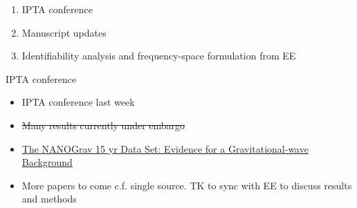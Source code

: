 \documentclass[10pt]{beamer}
\title{}
\subtitle{}
\author{}
\date{EE/GW meeting, June 29, 2023}
\begin{document}
	
	\maketitle
	
	\begin{frame}{}
		
		\begin{enumerate}
			\item IPTA conference
			\item Manuscript updates
			\item Identifiability analysis and frequency-space formulation from EE
		\end{enumerate}
	
\end{frame}



	\begin{frame}{IPTA conference}
	
	
	
	\begin{itemize}
		\item IPTA conference last week
		\item \sout{ Many results currently under embargo}
		\item \href{https://iopscience.iop.org/article/10.3847/2041-8213/acdac6}{The NANOGrav 15 yr Data Set: Evidence for a Gravitational-wave Background} 
		\item More papers to come c.f. single source. TK to sync with EE to discuss results and methods
	\end{itemize}
	
\end{frame}

	
	
	
	
	
	
\end{document}
